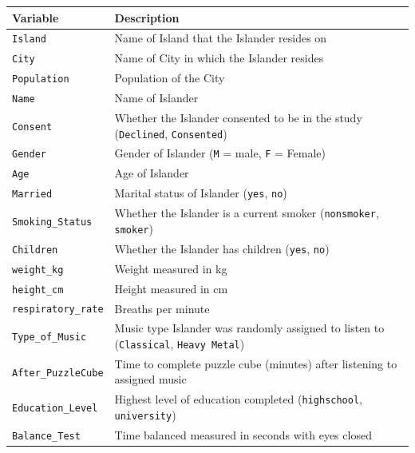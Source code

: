 \documentclass[
]{report}
\begin{document}
\begin{longtable}[]{@{}
  >{\raggedright\arraybackslash}p{}
  >{\raggedright\arraybackslash}p{}@{}}
\toprule\noalign{}
\begin{minipage}[b]{\linewidth}\raggedright
\textbf{Variable}
\end{minipage} & \begin{minipage}[b]{\linewidth}\raggedright
\textbf{Description}
\end{minipage} \\
\midrule\noalign{}
\endhead
\bottomrule\noalign{}
\endlastfoot
\texttt{Island} & Name of Island that the Islander resides on \\
\texttt{City} & Name of City in which the Islander resides \\
\texttt{Population} & Population of the City \\
\texttt{Name} & Name of Islander \\
\texttt{Consent} & Whether the Islander consented to be in the study (\texttt{Declined}, \texttt{Consented}) \\
\texttt{Gender} & Gender of Islander (\texttt{M} = male, \texttt{F} = Female) \\
\texttt{Age} & Age of Islander \\
\texttt{Married} & Marital status of Islander (\texttt{yes}, \texttt{no}) \\
\texttt{Smoking\_Status} & Whether the Islander is a current smoker (\texttt{nonsmoker}, \texttt{smoker}) \\
\texttt{Children} & Whether the Islander has children (\texttt{yes}, \texttt{no}) \\
\texttt{weight\_kg} & Weight measured in kg \\
\texttt{height\_cm} & Height measured in cm \\
\texttt{respiratory\_rate} & Breaths per minute \\
\texttt{Type\_of\_Music} & Music type Islander was randomly assigned to listen to (\texttt{Classical}, \texttt{Heavy\ Metal}) \\
\texttt{After\_PuzzleCube} & Time to complete puzzle cube (minutes) after listening to assigned music \\
\texttt{Education\_Level} & Highest level of education completed (\texttt{highschool}, \texttt{university}) \\
\texttt{Balance\_Test} & Time balanced measured in seconds with eyes closed \\

\end{longtable}
\end{document}
